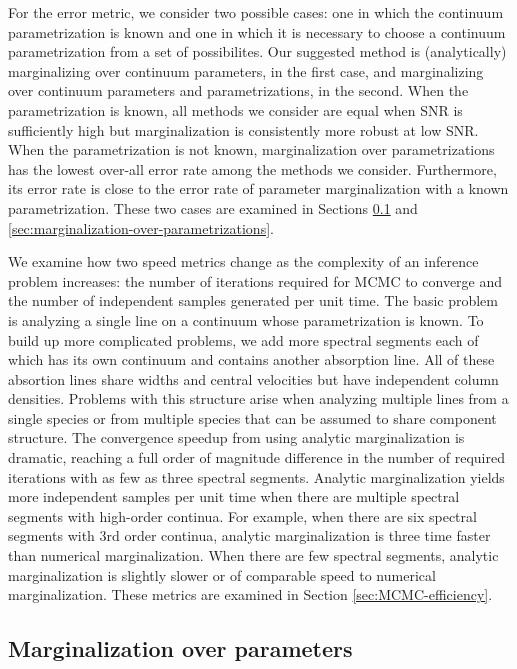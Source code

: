 \documentclass[manuscript]{aastex62}
\begin{document}
For the error metric, we consider two possible cases: one in which the continuum parametrization is known and one in which it is necessary to choose a continuum parametrization from a set of possibilites.
Our suggested method is (analytically) marginalizing over continuum parameters, in the first case, and marginalizing over continuum parameters and parametrizations, in the second.
When the parametrization is known, all methods we consider are equal when SNR is sufficiently high but marginalization is consistently more robust at low SNR.
When the parametrization is not known, marginalization over parametrizations has the lowest over-all error rate among the methods we consider.
Furthermore, its error rate is close to the error rate of parameter marginalization with a known parametrization.
These two cases are examined in Sections \ref{sec:marginalization-over-parameters} and \ref{sec:marginalization-over-parametrizations}.

We examine how two speed metrics change as the complexity of an inference problem increases: the number of iterations required for MCMC to converge and the number of independent samples generated per unit time.
The basic problem is analyzing a single line on a continuum whose parametrization is known.
To build up more complicated problems, we add more spectral segments each of which has its own continuum and contains another absorption line.
All of these absortion lines share widths and central velocities but have independent column densities.
Problems with this structure arise when analyzing multiple lines from a single species or from multiple species that can be assumed to share component structure.
The convergence speedup from using analytic marginalization is dramatic, reaching a full order of magnitude difference in the number of required iterations with as few as three spectral segments.
Analytic marginalization yields more independent samples per unit time when there are multiple spectral segments with high-order continua.
For example, when there are six spectral segments with 3rd order continua, analytic marginalization is three time faster than numerical marginalization.
When there are few spectral segments, analytic marginalization is slightly slower or of comparable speed to numerical marginalization.
These metrics are examined in Section \ref{sec:MCMC-efficiency}.

\subsection{Marginalization over parameters}
\label{sec:marginalization-over-parameters}
\end{document}
